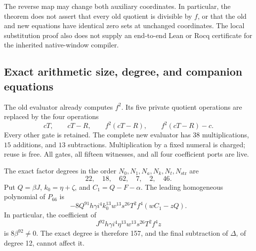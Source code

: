 The reverse map may change both auxiliary coordinates.  In particular,
the theorem does not assert that every old quotient is divisible by \(f\),
or that the old and new equations have identical zero sets at unchanged
coordinates.  The local substitution proof also does not supply an
end-to-end Lean or Rocq certificate for the inherited native-window
compiler.

\subsection{Exact arithmetic size, degree, and companion equations}

The old evaluator already computes \(f^2\).  Its five private quotient
operations are replaced by the four operations
\[
 cT,\qquad cT-R,\qquad f^2(cT-R),\qquad f^2(cT-R)-c.
\]
Every other gate is retained.  The complete new evaluator has
\(38\) multiplications, \(15\) additions, and \(13\) subtractions.
Multiplication by a fixed numeral is charged; reuse is free.  All gates,
all fifteen witnesses, and all four coefficient ports are live.

The exact factor degrees in the order
\(N_0,N_1,N_a,N_k,N_t,N_{\mathrm{str}}\) are
\[
 22,\quad18,\quad62,\quad7,\quad2,\quad46.
\]
Put \(Q=\beta J\), \(k_0=\eta+\zeta\), and
\(C_1=Q-F-\alpha\).  The leading homogeneous polynomial of \(P_{66}\) is
\[
 -8Q^{91}h\gamma i^4k_0^{13}w^{13}s^{26}T^2f^4
       (wC_1-zQ).
\]
In particular, the coefficient of
\[
 J^{92}h\gamma i^4\eta^{13}w^{13}s^{26}T^2f^4z
\]
is \(8\beta^{92}\ne0\).  The exact degree is therefore 157, and the
final subtraction of \(\Delta\), of degree 12, cannot affect it.

